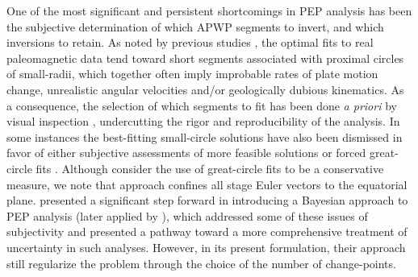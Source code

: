 \documentclass{article} %
\begin{document}
One of the most significant and persistent shortcomings in PEP analysis has been the subjective determination of which APWP segments to invert, and which inversions to retain. As noted by previous studies \citep[e.g.][]{tarling1996palaeomagnetic,wu2014derivation}, the optimal fits to real paleomagnetic data tend toward short segments associated with proximal circles of small-radii, which together often imply improbable rates of plate motion change, unrealistic angular velocities and/or geologically dubious kinematics. As a consequence, the selection of which segments to fit has been done \textit{a priori} by visual inspection \citep[e.g.][]{gordon1984paleomagnetic,may1986north,wu2014derivation}, undercutting the rigor and reproducibility of the analysis. In some instances the best-fitting small-circle solutions have also been dismissed in favor of either subjective assessments of more feasible solutions \citep{tarling1996palaeomagnetic} or forced great-circle fits \citep{smirnov2010co}. Although \cite{smirnov2010co} consider the use of great-circle fits to be a conservative measure, we note that approach confines all stage Euler vectors to the equatorial plane. \cite{RosePhdthesis} presented a significant step forward in introducing a Bayesian approach to PEP analysis (later applied by \cite{swanson2019failed}), which addressed some of these issues of subjectivity and presented a pathway toward a more comprehensive treatment of uncertainty in such analyses. However, in its present formulation, their approach still regularize the problem through the choice of the number of change-points.
\end{document}

